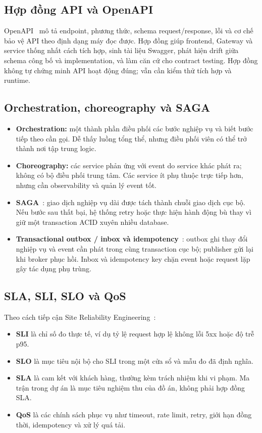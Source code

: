 \subsection{Hợp đồng API và OpenAPI}

OpenAPI~\cite{openapi} mô tả endpoint, phương thức, schema request/response, lỗi và cơ chế bảo vệ API theo định dạng máy đọc được. Hợp đồng giúp frontend, Gateway và service thống nhất cách tích hợp, sinh tài liệu Swagger, phát hiện drift giữa schema công bố và implementation, và làm căn cứ cho contract testing. Hợp đồng không tự chứng minh API hoạt động đúng; vẫn cần kiểm thử tích hợp và runtime.

\subsection{Orchestration, choreography và SAGA}

\begin{itemize}
  \item \textbf{Orchestration:} một thành phần điều phối các bước nghiệp vụ và biết bước tiếp theo cần gọi. Dễ thấy luồng tổng thể, nhưng điều phối viên có thể trở thành nơi tập trung logic.
  \item \textbf{Choreography:} các service phản ứng với event do service khác phát ra; không có bộ điều phối trung tâm. Các service ít phụ thuộc trực tiếp hơn, nhưng cần observability và quản lý event tốt.
  \item \textbf{SAGA}~\cite{garcia1987sagas}: giao dịch nghiệp vụ dài được tách thành chuỗi giao dịch cục bộ. Nếu bước sau thất bại, hệ thống retry hoặc thực hiện hành động bù thay vì giữ một transaction ACID xuyên nhiều database.
  \item \textbf{Transactional outbox / inbox và idempotency}~\cite{richardson2018}: outbox ghi thay đổi nghiệp vụ và event cần phát trong cùng transaction cục bộ; publisher gửi lại khi broker phục hồi. Inbox và idempotency key chặn event hoặc request lặp gây tác dụng phụ trùng.
\end{itemize}

\subsection{SLA, SLI, SLO và QoS}

Theo cách tiếp cận Site Reliability Engineering~\cite{beyer2016sre}:

\begin{itemize}
  \item \textbf{SLI} là chỉ số đo thực tế, ví dụ tỷ lệ request hợp lệ không lỗi 5xx hoặc độ trễ p95.
  \item \textbf{SLO} là mục tiêu nội bộ cho SLI trong một cửa sổ và mẫu đo đã định nghĩa.
  \item \textbf{SLA} là cam kết với khách hàng, thường kèm trách nhiệm khi vi phạm. Ma trận trong dự án là mục tiêu nghiệm thu của đồ án, không phải hợp đồng SLA.
  \item \textbf{QoS} là các chính sách phục vụ như timeout, rate limit, retry, giới hạn đồng thời, idempotency và xử lý quá tải.
\end{itemize}
